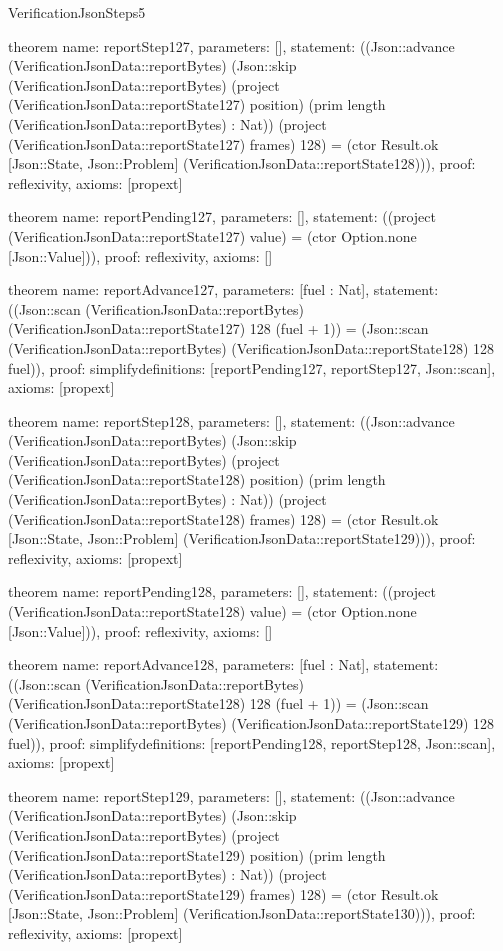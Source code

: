 \begin{lexlean}{VerificationJsonSteps5}
\begin{semanticmodule}
theorem{
  name: reportStep127,
  parameters: [],
  statement: ((Json::advance (VerificationJsonData::reportBytes) (Json::skip (VerificationJsonData::reportBytes) (project (VerificationJsonData::reportState127) position) (prim length (VerificationJsonData::reportBytes) : Nat)) (project (VerificationJsonData::reportState127) frames) 128) = (ctor Result.ok [Json::State, Json::Problem] (VerificationJsonData::reportState128))),
  proof: reflexivity{},
  axioms: [propext]
}

theorem{
  name: reportPending127,
  parameters: [],
  statement: ((project (VerificationJsonData::reportState127) value) = (ctor Option.none [Json::Value])),
  proof: reflexivity{},
  axioms: []
}

theorem{
  name: reportAdvance127,
  parameters: [fuel : Nat],
  statement: ((Json::scan (VerificationJsonData::reportBytes) (VerificationJsonData::reportState127) 128 (fuel + 1)) = (Json::scan (VerificationJsonData::reportBytes) (VerificationJsonData::reportState128) 128 fuel)),
  proof: simplify{definitions: [reportPending127, reportStep127, Json::scan]},
  axioms: [propext]
}

theorem{
  name: reportStep128,
  parameters: [],
  statement: ((Json::advance (VerificationJsonData::reportBytes) (Json::skip (VerificationJsonData::reportBytes) (project (VerificationJsonData::reportState128) position) (prim length (VerificationJsonData::reportBytes) : Nat)) (project (VerificationJsonData::reportState128) frames) 128) = (ctor Result.ok [Json::State, Json::Problem] (VerificationJsonData::reportState129))),
  proof: reflexivity{},
  axioms: [propext]
}

theorem{
  name: reportPending128,
  parameters: [],
  statement: ((project (VerificationJsonData::reportState128) value) = (ctor Option.none [Json::Value])),
  proof: reflexivity{},
  axioms: []
}

theorem{
  name: reportAdvance128,
  parameters: [fuel : Nat],
  statement: ((Json::scan (VerificationJsonData::reportBytes) (VerificationJsonData::reportState128) 128 (fuel + 1)) = (Json::scan (VerificationJsonData::reportBytes) (VerificationJsonData::reportState129) 128 fuel)),
  proof: simplify{definitions: [reportPending128, reportStep128, Json::scan]},
  axioms: [propext]
}

theorem{
  name: reportStep129,
  parameters: [],
  statement: ((Json::advance (VerificationJsonData::reportBytes) (Json::skip (VerificationJsonData::reportBytes) (project (VerificationJsonData::reportState129) position) (prim length (VerificationJsonData::reportBytes) : Nat)) (project (VerificationJsonData::reportState129) frames) 128) = (ctor Result.ok [Json::State, Json::Problem] (VerificationJsonData::reportState130))),
  proof: reflexivity{},
  axioms: [propext]
}


\end{semanticmodule}
\end{lexlean}
